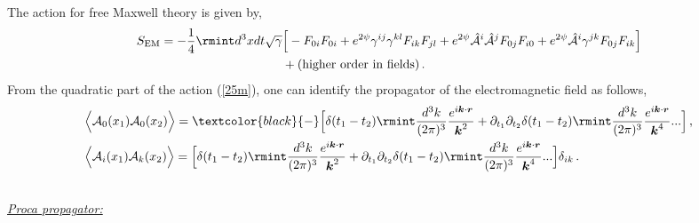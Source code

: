 The action for free Maxwell theory is given by,
\begin{align}
    \begin{split}
        S_{\text{EM}}=-\frac{1}{4}\rmint d^3x dt \sqrt{\gamma}&\Big[-F_{0i}F_{0i}+e^{2\psi}\gamma^{ij}\gamma^{kl}F_{ik}F_{jl}+e^{2\psi}\Hat{\mathcal{A}}^{i}\Hat{\mathcal{A}}^{j}F_{0j}F_{i0}+e^{2\psi}\Hat{\mathcal{A}}^{i}\gamma^{jk}F_{0j}F_{ik}\Big]\\ &
        +(\text{higher order in fields})\,.\label{25m}
    \end{split}
\end{align}
From the quadratic part of the action (\ref{25m}), one can identify the propagator of the electromagnetic field as follows,
\begin{align}
    \begin{split}
&\Big\langle\mathcal{A}_{0}(x_1)\mathcal{A}_0(x_2)\Big\rangle=\textcolor{black}{-}\Big[\delta(t_1-t_2)\rmint \frac{d^3k}{(2\pi)^3}\frac{e^{i\boldsymbol{k}\cdot\boldsymbol{r}}}{\boldsymbol{k}^2}+\partial_{t_1}\partial_{t_2}\delta(t_1-t_2)\rmint \frac{d^3k}{(2\pi)^3}\frac{e^{i\boldsymbol{k}\cdot\boldsymbol{r}}}{\boldsymbol{k}^4}...\Big]\,,\\ &
        \Big\langle\mathcal{A}_{i}(x_1)\mathcal{A}_k(x_2)\Big\rangle=\Big[\delta(t_1-t_2)\rmint \frac{d^3k}{(2\pi)^3}\frac{e^{i\boldsymbol{k}\cdot\boldsymbol{r}}}{\boldsymbol{k}^2}+\partial_{t_1}\partial_{t_2}\delta(t_1-t_2)\rmint \frac{d^3k}{(2\pi)^3}\frac{e^{i\boldsymbol{k}\cdot\boldsymbol{r}}}{\boldsymbol{k}^4}...\Big]\delta_{ik}\,.\\ &
    \end{split}
\end{align}
\underline{\textit{ Proca propagator:}}

